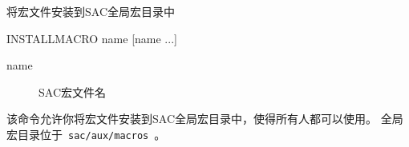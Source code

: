 \label{cmd:installmacro}

将宏文件安装到SAC全局宏目录中

\begin{SACSTX}
INSTALLMACRO name [name ...]
\end{SACSTX}

\begin{description}
\item [name] SAC宏文件名
\end{description}

该命令允许你将宏文件安装到SAC全局宏目录中，使得所有人都可以使用。
全局宏目录位于~\lstinline{sac/aux/macros}~。


